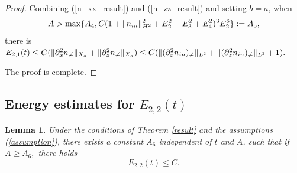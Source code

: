 \documentclass[12pt, reqno]{amsart}
\newtheorem{lemma}{Lemma}[section]
\numberwithin{equation}{section}
\begin{document}
\begin{proof}
		Combining (\ref{n_xx_result}) and (\ref{n_zz_result}) and setting $b=a$, 
		when $$A>\max\{A_4, C(1+\|n_{\rm in}\|_{H^2}^2
		+E_2^2+E_3^2+E_4^2)^3E_2^6\}:=A_5,$$
		there is 
		$E_{2,1}(t)\leq C(\|\partial_x^2n_{\neq}\|_{X_a}+\|\partial_z^2n_{\neq}\|_{X_a})
		\leq C(\|(\partial_x^2n_{\rm in})_{\neq}\|_{L^2}
		+\|(\partial_z^2n_{\rm in})_{\neq}\|_{L^2}+1).$
		
		The proof is complete.
	\end{proof}
	
	\subsection{Energy estimates for $E_{2,2}(t)$}
	\begin{lemma}\label{result_0_2}
		Under the conditions of Theorem \ref{result} and the assumptions (\ref{assumption}),
		there exists a constant $A_6$ independent of  $t$ and $A$, such that
		if $A\geq A_6,$ there holds
		$$E_{2,2}(t)\leq C.$$
	\end{lemma}
	
\end{document}
